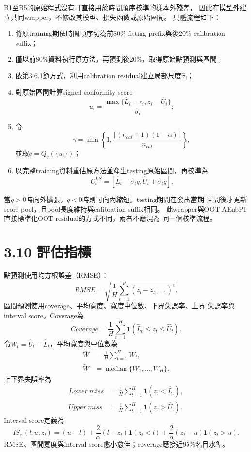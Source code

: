 B1至B5的原始程式沒有可直接用於時間順序校準的樣本外殘差，
因此在模型外建立共同wrapper，不修改其模型、損失函數或原始區間。
具體流程如下：
\begin{enumerate}
 \item 將原training期依時間順序切為前80\% fitting prefix與後20\% calibration suffix；
 \item 僅以前80\%資料執行原方法，再預測後20\%，取得原始點預測與區間；
 \item 依第3.6.1節方式，利用calibration residual建立局部尺度$\widehat\sigma_i$；
 \item 對原始區間計算signed conformity score
 \begin{equation}
  u_i=\frac{\max\{\widehat L_i-z_i,z_i-\widehat U_i\}}
  {\widehat\sigma_i};
 \end{equation}
 \item 令
 \begin{equation}
  \gamma=\min\left\{1,
  \frac{\lceil(n_{cal}+1)(1-\alpha)\rceil}{n_{cal}}
  \right\},
 \end{equation}
 並取$q=Q_{\gamma}(\{u_i\})$；
 \item 以完整training資料重估原方法並產生testing原始區間，再校準為
 \begin{equation}
  C_t^{LS}=\left[
  \widehat L_t-\widehat\sigma_tq,
  \widehat U_t+\widehat\sigma_tq
  \right].
 \end{equation}
\end{enumerate}
當$q>0$時向外擴張，$q<0$時則可向內縮短。testing期間在發出當期
區間後才更新score pool，且pool長度維持與calibration suffix相同。
此wrapper與OOT-AEnbPI直接標準化OOT residual的方式不同，兩者不應混為
同一個校準流程。

\section*{3.10 評估指標}

點預測使用均方根誤差（RMSE）：
\begin{equation}
 RMSE=\sqrt{\frac{1}{H}\sum_{t=1}^{H}
 (z_t-\widehat z_{t|t-1})^2}.
\end{equation}
區間預測使用coverage、平均寬度、寬度中位數、下界失誤率、上界
失誤率與interval score。Coverage為
\begin{equation}
 Coverage=\frac{1}{H}\sum_{t=1}^{H}
 \mathbf 1(\widehat L_t\leq z_t\leq\widehat U_t).
\end{equation}
令$W_t=\widehat U_t-\widehat L_t$，平均寬度與中位數為
\begin{align}
 \overline W&=\frac{1}{H}\sum_{t=1}^{H}W_t,\\
 \widetilde W&=\operatorname{median}\{W_1,\ldots,W_H\}.
\end{align}
上下界失誤率為
\begin{align}
 Lower\ miss&=\frac{1}{H}\sum_{t=1}^{H}
 \mathbf 1(z_t<\widehat L_t),\\
 Upper\ miss&=\frac{1}{H}\sum_{t=1}^{H}
 \mathbf 1(z_t>\widehat U_t).
\end{align}
Interval score定義為
\begin{equation}
 IS_{\alpha}(l,u;z_t)=(u-l)
 +\frac{2}{\alpha}(l-z_t)\mathbf 1(z_t<l)
 +\frac{2}{\alpha}(z_t-u)\mathbf 1(z_t>u).
\end{equation}
RMSE、區間寬度與interval score愈小愈佳；coverage應接近95\%名目水準。
